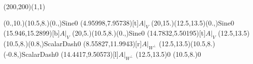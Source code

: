 \unitlength=1bp%

\begin{feynartspicture}(200,200)(1,1)

\FADiagram{}
\FAProp(0.,10.)(10.5,8.)(0.,){Sine}{0}
\FALabel(4.95998,7.95738)[t]{$A|_V$}
\FAProp(20,15.)(12.5,13.5)(0.,){Sine}{0}
\FALabel(15.946,15.2899)[b]{$A|_V$}
\FAProp(20,5.)(10.5,8.)(0.,){Sine}{0}
\FALabel(14.7832,5.50195)[t]{$A|_V$}
\FAProp(12.5,13.5)(10.5,8.)(0.8,){ScalarDash}{0}
\FALabel(8.55827,11.9943)[r]{$A|_{W^\perp}$}
\FAProp(12.5,13.5)(10.5,8.)(-0.8,){ScalarDash}{0}
\FALabel(14.4417,9.50573)[l]{$A|_{W^\perp}$}
\FAVert(12.5,13.5){0}
\FAVert(10.5,8.){0}
\end{feynartspicture}

